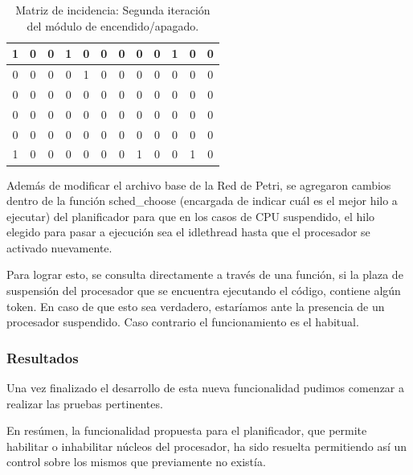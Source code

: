\begin{table}[H]
    \centering
    \begin{tabular}{|c|c|c|c|c|c|c|c|c|c|c|c|}
        \hline
        1 & 0 & 0 & 1 & \cellcolor{lightgray}0 & 0 & 0 & 0 & 0 & 1 & 0 & 0 \\
        \hline
        0 & 0 & 0 & 0 & \cellcolor{lightgray}1 & 0 & 0 & 0 & 0 & 0 & 0 & 0 \\
        \hline
        0 & 0 & 0 & 0 & \cellcolor{lightgray}0 & 0 & 0 & 0 & 0 & 0 & 0 & 0 \\
        \hline
        0 & 0 & 0 & 0 & \cellcolor{lightgray}0 & 0 & 0 & 0 & 0 & 0 & 0 & 0 \\
        \hline
        0 & 0 & 0 & 0 & \cellcolor{lightgray}0 & 0 & 0 & 0 & 0 & 0 & 0 & 0 \\
        \hline
        1 & 0 & 0 & 0 & \cellcolor{lightgray}0 & 0 & 0 & 1 & 0 & 0 & 1 & 0 \\
        \hline
    \end{tabular}
    \caption{Matriz de incidencia: Segunda iteración del módulo de encendido/apagado.}
    \label{tabla:matriz_incidencia_post_2}
\end{table}



Además de modificar el archivo base de la Red de Petri, se agregaron cambios dentro de la función sched\_choose (encargada de indicar cuál es el mejor hilo a ejecutar) del planificador para que en los casos de CPU suspendido, el hilo elegido para pasar a ejecución sea el idlethread hasta que el procesador se activado nuevamente.\par

Para lograr esto, se consulta directamente a través de una función, si la plaza de suspensión del procesador que se encuentra ejecutando el código, contiene algún token. En caso de que esto sea verdadero, estaríamos ante la presencia de un procesador suspendido. Caso contrario el funcionamiento es el habitual.\par


\subsubsection{Resultados}

Una vez finalizado el desarrollo de esta nueva funcionalidad pudimos comenzar a realizar las pruebas pertinentes.\par

En resúmen, la funcionalidad propuesta para el planificador, que permite habilitar o inhabilitar núcleos del procesador, ha sido resuelta permitiendo así un control sobre los mismos que previamente no existía.\par

